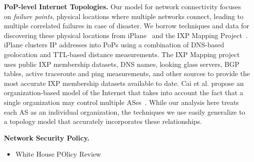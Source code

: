 
{\bf PoP-level Internet Topologies.}  Our model for network connectivity
    focuses on {\it failure points}, physical locations where multiple networks
    connect, leading to multiple correlated failures in case of disaster.  We
    borrow techniques and data for discovering these physical locations from
    iPlane~\cite{iplane} and the IXP Mapping Project~\cite{ixps-mapped}.
    iPlane clusters IP addresses into PoPs using a combination of DNS-based
    geolocation and TTL-based distance measurements.  The IXP Mapping project
    uses public IXP membership datasets, DNS names, looking glass servers, BGP
    tables, active traceroute and ping measurements, and other sources to
    provide the most accurate IXP membership datasets available to date. Cai et
    al.  propose an organization-based model of the Internet that takes into
    account the fact that a single organization may control multiple
    ASes~\cite{as-to-org}. While our analysis here treats each AS as an
    individual organization, the techniques we use easily generalize to a
    topology model that accurately incorporates these relationships.   

{\bf Network Security Policy.}
    \begin{itemize}
        \item White House POlicy Review~\cite{cyberspacepolicy} 
    \end{itemize}
